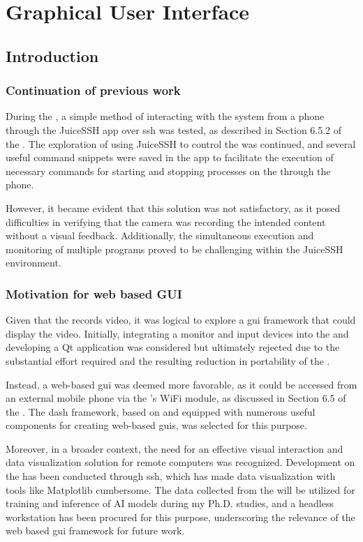 \chapter{Graphical User Interface}
\label{chap:gui}
\section{Introduction}
\subsection{Continuation of previous work}
During the \preproject, a simple method of interacting with the system from a phone through the JuiceSSH app over \gls{ssh} was tested, as described in Section 6.5.2 of the \preproject.
The exploration of using JuiceSSH to control the \sr was continued, and several useful command snippets were saved in the app to facilitate the execution of necessary commands for starting and stopping processes on the \jx through the phone.

However, it became evident that this solution was not satisfactory, as it posed difficulties in verifying that the camera was recording the intended content without a visual feedback.
Additionally, the simultaneous execution and monitoring of multiple programs proved to be challenging within the JuiceSSH environment.


\subsection{Motivation for web based GUI}
Given that the \sr records video, it was logical to explore a \gls{gui} framework that could display the video.
Initially, integrating a monitor and input devices into the \sr and developing a Qt application was considered but ultimately rejected due to the substantial effort required and the resulting reduction in portability of the \sr.

Instead, a web-based \gls{gui} was deemed more favorable, as it could be accessed from an external mobile phone via the \sr's WiFi module, as discussed in Section 6.5 of the \preproject.
The \gls{dash} framework, based on \py and equipped with numerous useful components for creating web-based \glspl{gui}, was selected for this purpose.

Moreover, in a broader context, the need for an effective visual interaction and data visualization solution for remote computers was recognized.
Development on the \jx has been conducted through \gls{ssh}, which has made data visualization with tools like Matplotlib cumbersome.
The data collected from the \sr will be utilized for training and inference of AI models during my Ph.D.
studies, and a headless workstation has been procured for this purpose, underscoring the relevance of the web based \gls{gui} framework for future work.


